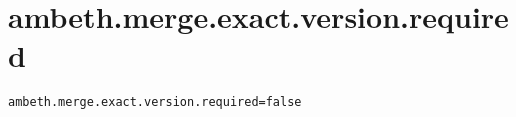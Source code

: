 \section{ambeth.merge.exact.version.required}
\label{configuration:AmbethMergeExactVersionRequired}
\ClearAPI
\TODO
{}
\begin{lstlisting}[style=Props,caption={Usage example for \textit{ambeth.merge.exact.version.required}}]
ambeth.merge.exact.version.required=false
\end{lstlisting}